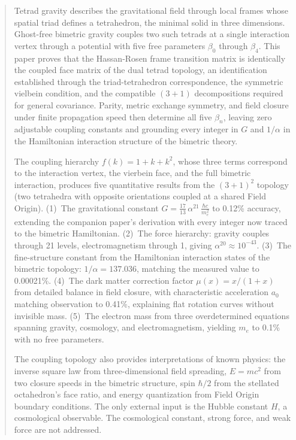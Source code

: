 \documentclass[aps,prd,preprint,superscriptaddress,showpacs,preprintnumbers,amsmath,amssymb,nofootinbib]{revtex4-2}
\begin{document}
\begin{abstract}
Tetrad gravity describes the gravitational field through local frames whose spatial triad defines a tetrahedron, the minimal solid in three dimensions. Ghost-free bimetric gravity couples two such tetrads at a single interaction vertex through a potential with five free parameters $\beta_0$ through $\beta_4$. This paper proves that the Hassan-Rosen frame transition matrix is identically the coupled face matrix of the dual tetrad topology, an identification established through the triad-tetrahedron correspondence, the symmetric vielbein condition, and the compatible $(3{+}1)$ decompositions required for general covariance. Parity, metric exchange symmetry, and field closure under finite propagation speed then determine all five $\beta_n$, leaving zero adjustable coupling constants and grounding every integer in $G$ and $1/\alpha$ in the Hamiltonian interaction structure of the bimetric theory.

The coupling hierarchy $f(k) = 1 + k + k^2$, whose three terms correspond to the interaction vertex, the vierbein face, and the full bimetric interaction, produces five quantitative results from the $(3{+}1)^2$ topology (two tetrahedra with opposite orientations coupled at a shared Field Origin). (1)~The gravitational constant $G = \frac{17}{13}\,\alpha^{21}\,\frac{\hbar c}{m_e^2}$ to 0.12\% accuracy, extending the companion paper's derivation with every integer now traced to the bimetric Hamiltonian. (2)~The force hierarchy: gravity couples through 21 levels, electromagnetism through 1, giving $\alpha^{20} \approx 10^{-43}$. (3)~The fine-structure constant from the Hamiltonian interaction states of the bimetric topology: $1/\alpha = 137.036$, matching the measured value to 0.00021\%. (4)~The dark matter correction factor $\mu(x) = x/(1+x)$ from detailed balance in field closure, with characteristic acceleration $a_0$ matching observation to 0.41\%, explaining flat rotation curves without invisible mass. (5)~The electron mass from three overdetermined equations spanning gravity, cosmology, and electromagnetism, yielding $m_e$ to 0.1\% with no free parameters.

The coupling topology also provides interpretations of known physics: the inverse square law from three-dimensional field spreading, $E = mc^2$ from two closure speeds in the bimetric structure, spin $\hbar/2$ from the stellated octahedron's face ratio, and energy quantization from Field Origin boundary conditions. The only external input is the Hubble constant $H$, a cosmological observable. The cosmological constant, strong force, and weak force are not addressed.
\end{abstract}
\end{document}
